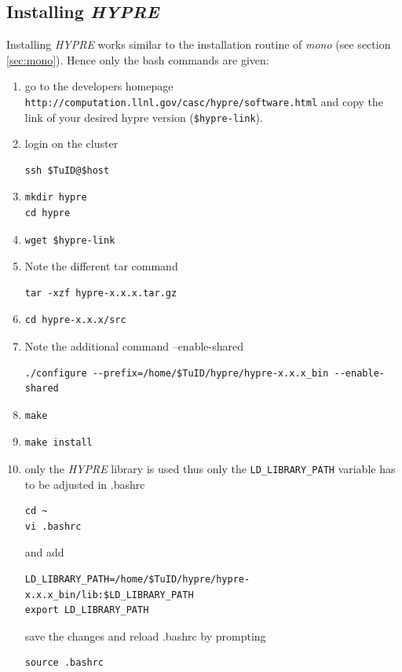 \documentclass[11pt,twoside,a4paper]{fdyartcl}
\begin{document}
\subsection{Installing \emph{HYPRE}}
Installing \emph{HYPRE} works similar to the installation routine of \emph{mono} (see section \ref{sec:mono}). Hence only the bash commands are given:
\begin{enumerate}
\item go to the developers homepage \verb|http://computation.llnl.gov/casc/hypre/software.html| and copy the link of your desired hypre version (\verb|$hypre-link|). 
\item login on the cluster
\begin{verbatim}
ssh $TuID@$host
\end{verbatim}
\item 
\begin{verbatim}
mkdir hypre
cd hypre
\end{verbatim}
\item 
\begin{verbatim}
wget $hypre-link
\end{verbatim}
\item Note the different tar command
\begin{verbatim}
tar -xzf hypre-x.x.x.tar.gz
\end{verbatim}
\item 
\begin{verbatim}
cd hypre-x.x.x/src
\end{verbatim}
\item Note the additional command --enable-shared 
\begin{verbatim}
./configure --prefix=/home/$TuID/hypre/hypre-x.x.x_bin --enable-shared
\end{verbatim} 
\item 
\begin{verbatim}
make
\end{verbatim}
\item
\begin{verbatim}
make install
\end{verbatim} 
\item only the \emph{HYPRE} library is used thus only the \verb|LD_LIBRARY_PATH| variable has to be adjusted in .bashrc
\begin{verbatim}
cd ~
vi .bashrc
\end{verbatim}
and add
\begin{verbatim}
LD_LIBRARY_PATH=/home/$TuID/hypre/hypre-x.x.x_bin/lib:$LD_LIBRARY_PATH
export LD_LIBRARY_PATH
\end{verbatim}
save the changes and reload .bashrc by prompting
\begin{verbatim}
source .bashrc
\end{verbatim}
\end{enumerate} 
\end{document}
